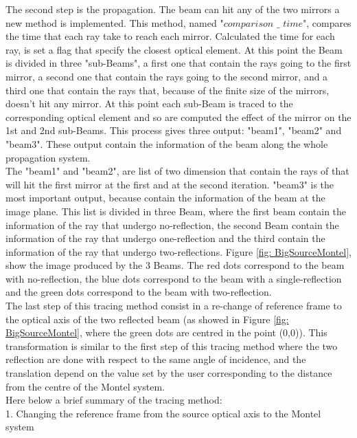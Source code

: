 The second step is the propagation. The beam can hit any of the two mirrors a new method is implemented. This method, named "$comparison $ $\_ $ $time$", compares the time that each ray take to reach each mirror. Calculated the time for each ray, is set a flag that specify the closest optical element. At this point the Beam is divided in three "sub-Beams", a first one that contain the rays going to the first mirror, a second one that contain the rays going to the second mirror, and a third one that contain the rays that, because of the finite size of the mirrors, doesn't hit any mirror. At this point each sub-Beam is traced to the corresponding optical element and so are computed the effect of the mirror on the 1st and 2nd sub-Beams. This process gives three output: "beam1", "beam2" and "beam3". These output contain the information of the beam along the whole propagation system.
\\
%
%
%
%
%
The "beam1" and "beam2", are list of two dimension that contain the rays of that will hit the first mirror at the first and at the second iteration. "beam3" is the most important output, because contain the information of the beam at the image plane. This list is divided in three Beam, where the first beam contain the information of the ray that undergo no-reflection, the second Beam contain the information of the ray that undergo one-reflection and the third contain the information of the ray that undergo two-reflections.
Figure \ref{fig: BigSourceMontel}, show the image produced by the 3 Beams. The red dots correspond to the beam with no-reflection, the blue dots correspond to the beam with a single-reflection and the green dots correspond to the beam with two-reflection.
\\
The last step of this tracing method consist in a re-change of reference frame to the optical axis of the two reflected beam (as showed in Figure \ref{fig: BigSourceMontel}, where the green dots are centred in the point (0,0)). This transformation is similar to the first step of this tracing method where the two reflection are done with respect to the same angle of incidence, and the translation depend on the value set by the user corresponding to the distance from the centre  of the Montel system.
\\
Here below a brief summary of the tracing method:
	\\ \hspace{20mm} 1. Changing the reference frame from the source optical axis to the Montel system

